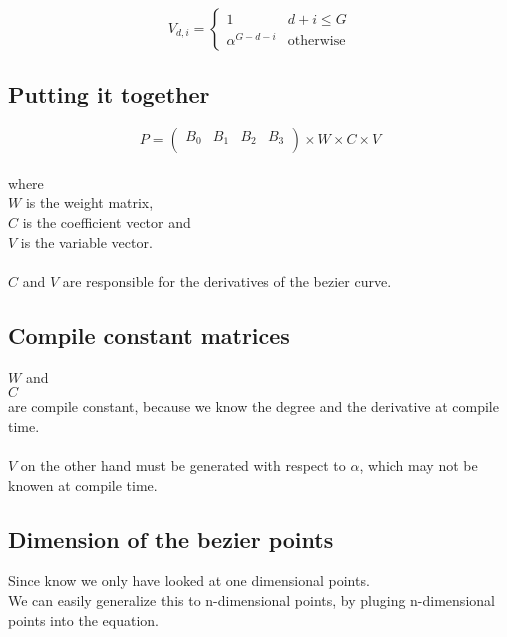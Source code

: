 \begin{equation*}
    V_{d,i}=\begin{cases}
        1                  & d + i \leq G     \\
        \alpha^{G - d - i} & \text{otherwise}
    \end{cases}
\end{equation*}

\subsection{Putting it together}

\begin{equation*}
    P=
    \left(
    \begin{array}{cccc}
        B_0 & B_1 & B_2 & B_3 \\
    \end{array}
    \right)
    \times
    W
    \times
    C
    \times
    V
\end{equation*}
\\
where
\\
$W$ is the weight matrix,\\
$C$ is the coefficient vector and\\
$V$ is the variable vector.\\
\\
$C$ and $V$ are responsible for the derivatives of the bezier curve.

\subsection{Compile constant matrices}

$W$ and\\
$C$ \\
are compile constant, because we know the degree and the derivative at compile time.
\\\\
$V$ on the other hand must be generated with respect to $\alpha$, which may not be knowen at compile time.

\subsection{Dimension of the bezier points}

Since know we only have looked at one dimensional points.\\
We can easily generalize this to n-dimensional points, by pluging n-dimensional points into the equation.

